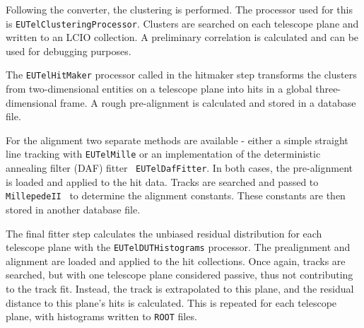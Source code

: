 Following the converter, the clustering is performed. The processor used for
this is \texttt{EUTelClusteringProcessor}. Clusters are searched on each
telescope plane and written to an LCIO collection. A preliminary correlation is
calculated and can be used for debugging purposes.

The \texttt{EUTelHitMaker} processor called in the hitmaker step transforms the
clusters from two-dimensional entities on a telescope plane into hits in a
global three-dimensional frame. A rough pre-alignment is calculated and stored
in a database file.

For the alignment two separate methods are available - either a simple straight
line tracking with \texttt{EUTelMille} or an implementation of the deterministic
annealing filter (DAF) fitter~\cite{ref:daffitter} \texttt{EUTelDafFitter}. In
both cases, the pre-alignment is loaded and applied to the hit data. Tracks are
searched and passed to \texttt{MillepedeII}~\cite{ref:millepede} to determine
the alignment constants. These constants are then stored in another database
file.

The final fitter step calculates the unbiased residual distribution for each
telescope plane with the \texttt{EUTelDUTHistograms} processor. The prealignment
and alignment are loaded and applied to the hit collections. Once again, tracks
are searched, but with one telescope plane considered passive, thus not
contributing to the track fit. Instead, the track is extrapolated to this plane,
and the residual distance to this plane's hits is calculated. This is repeated
for each telescope plane, with histograms written to \texttt{ROOT} files.


